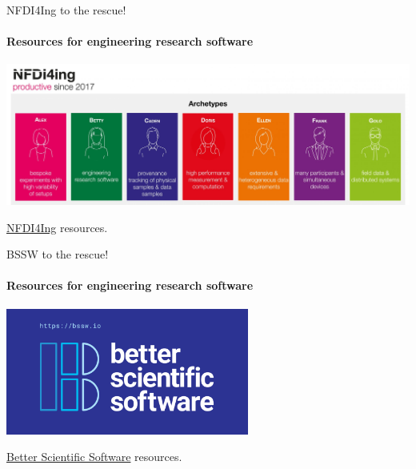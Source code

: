\begin{frame}{NFDI4Ing to the rescue!}
\framesubtitle{Resources for engineering research software}
    \vfill

    \begin{center}
    \includegraphics[width=\textwidth]{figures/nfdi4ing.jpg}
    \end{center}
    \href{https://nfdi4ing.de}{NFDI4Ing} resources. 

\end{frame}

\begin{frame}{BSSW to the rescue!}
\framesubtitle{Resources for engineering research software}
    \vfill

    \begin{center}
    \includegraphics[width=0.6\textwidth]{figures/bssw.png}
    \end{center}
    \href{https://bssw.io}{Better Scientific Software} resources. 

\end{frame}


